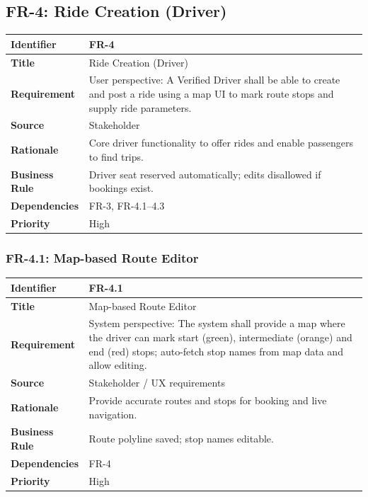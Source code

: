 \subsection{FR-4: Ride Creation (Driver)}

\begin{longtable}{|p{3cm}|p{12cm}|}
\hline
\rowcolor{lightgray!30}
\textbf{Identifier} & FR-4 \\
\hline
\textbf{Title} & Ride Creation (Driver) \\
\hline
\textbf{Requirement} & User perspective: A Verified Driver shall be able to create and post a ride using a map UI to mark route stops and supply ride parameters. \\
\hline
\textbf{Source} & Stakeholder \\
\hline
\textbf{Rationale} & Core driver functionality to offer rides and enable passengers to find trips. \\
\hline
\textbf{Business Rule} & Driver seat reserved automatically; edits disallowed if bookings exist. \\
\hline
\textbf{Dependencies} & FR-3, FR-4.1–4.3 \\
\hline
\textbf{Priority} & High \\
\hline
\end{longtable}

\subsubsection{FR-4.1: Map-based Route Editor}

\begin{longtable}{|p{3cm}|p{12cm}|}
\hline
\rowcolor{lightgray!30}
\textbf{Identifier} & FR-4.1 \\
\hline
\textbf{Title} & Map-based Route Editor \\
\hline
\textbf{Requirement} & System perspective: The system shall provide a map where the driver can mark start (green), intermediate (orange) and end (red) stops; auto-fetch stop names from map data and allow editing. \\
\hline
\textbf{Source} & Stakeholder / UX requirements \\
\hline
\textbf{Rationale} & Provide accurate routes and stops for booking and live navigation. \\
\hline
\textbf{Business Rule} & Route polyline saved; stop names editable. \\
\hline
\textbf{Dependencies} & FR-4 \\
\hline
\textbf{Priority} & High \\
\hline
\end{longtable}

